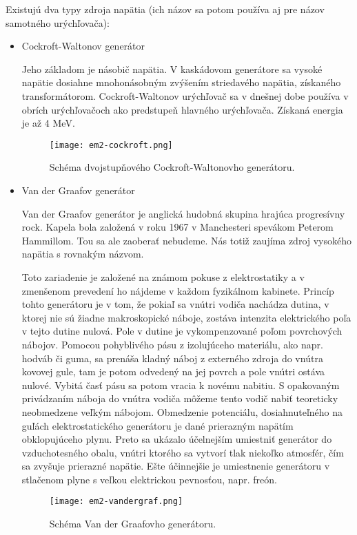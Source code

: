 \documentclass[../../main.tex]{subfiles}
\begin{document}
Existujú dva typy zdroja napätia (ich názov sa potom používa aj pre názov samotného urýchľovača):
\begin{itemize}
\item Cockroft-Waltonov generátor

Jeho základom je násobič napätia. V kaskádovom generátore sa vysoké napätie dosiahne mnohonásobným zvýšením striedavého napätia, získaného transformátorom. Cockroft-Waltonov urýchľovač sa v dnešnej dobe používa v obrích urýchľovačoch ako predstupeň hlavného urýchľovača. Získaná energia je až 4 MeV.

\begin{figure}[h]
\centering
\texttt{[image: em2-cockroft.png]}
\caption{Schéma dvojstupňového Cockroft-Waltonovho generátoru.}
\label{em2:img:cockroft}
\end{figure}

\item Van der Graafov generátor

Van der Graafov generátor je anglická hudobná skupina hrajúca progresívny rock. Kapela bola založená v roku 1967 v Manchesteri spevákom Peterom Hammillom. Tou sa ale zaoberať nebudeme. Nás totiž zaujíma zdroj vysokého napätia s rovnakým názvom.

Toto zariadenie je založené na známom pokuse z elektrostatiky a v zmenšenom prevedení ho nájdeme v každom fyzikálnom kabinete. Princíp tohto generátoru je v tom, že pokiaľ sa vnútri vodiča nachádza dutina, v ktorej nie sú žiadne makroskopické náboje, zostáva intenzita elektrického poľa v tejto dutine nulová. Pole v dutine je vykompenzované poľom povrchových nábojov. Pomocou pohyblivého pásu z izolujúceho materiálu, ako napr. hodváb či guma, sa prenáša kladný náboj z externého zdroja do vnútra kovovej gule, tam je potom odvedený na jej povrch a pole vnútri ostáva nulové. Vybitá časť pásu sa potom vracia k novému nabitiu. S opakovaným privádzaním náboja do vnútra vodiča môžeme tento
 vodič nabiť teoreticky neobmedzene veľkým nábojom. Obmedzenie potenciálu, dosiahnuteľného na guľách elektrostatického generátoru je dané prierazným napätím obklopujúceho plynu. Preto sa ukázalo účelnejším umiestniť generátor do vzduchotesného obalu, vnútri ktorého sa vytvorí tlak niekoľko atmosfér, čím sa zvyšuje prierazné napätie. Ešte účinnejšie je umiestnenie generátoru v stlačenom plyne s veľkou elektrickou pevnosťou, napr. freón. 

\begin{figure}[h]
\centering
\texttt{[image: em2-vandergraf.png]}
\caption{Schéma Van der Graafovho generátoru.}
\label{em2:img:vandergraf}
\end{figure}

\end{itemize}
\end{document}

